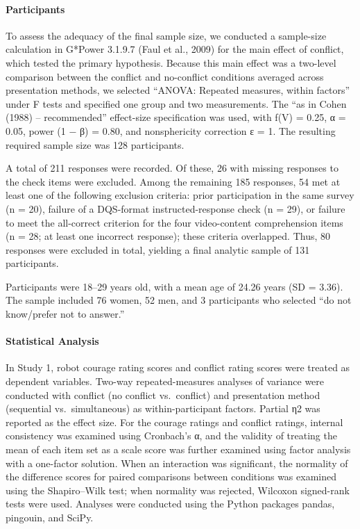 \paragraph{Participants}\label{participants}

To assess the adequacy of the final sample size, we conducted a
sample-size calculation in G*Power 3.1.9.7 (Faul et al., 2009) for the
main effect of conflict, which tested the primary hypothesis. Because
this main effect was a two-level comparison between the conflict and
no-conflict conditions averaged across presentation methods, we selected
``ANOVA: Repeated measures, within factors'' under F tests and specified
one group and two measurements. The ``as in Cohen (1988) --
recommended'' effect-size specification was used, with f(V) = 0.25, α =
0.05, power (1 − β) = 0.80, and nonsphericity correction ε = 1. The
resulting required sample size was 128 participants.

A total of 211 responses were recorded. Of these, 26 with missing
responses to the check items were excluded. Among the remaining 185
responses, 54 met at least one of the following exclusion criteria:
prior participation in the same survey (n = 20), failure of a DQS-format
instructed-response check (n = 29), or failure to meet the all-correct
criterion for the four video-content comprehension items (n = 28; at
least one incorrect response); these criteria overlapped. Thus, 80
responses were excluded in total, yielding a final analytic sample of
131 participants.

Participants were 18--29 years old, with a mean age of 24.26 years (SD =
3.36). The sample included 76 women, 52 men, and 3 participants who
selected ``do not know/prefer not to answer.''

\paragraph{Statistical Analysis}\label{statistical-analysis}

In Study 1, robot courage rating scores and conflict rating scores were
treated as dependent variables. Two-way repeated-measures analyses of
variance were conducted with conflict (no conflict vs.~conflict) and
presentation method (sequential vs.~simultaneous) as within-participant
factors. Partial η2 was reported as the effect size. For the courage
ratings and conflict ratings, internal consistency was examined using
Cronbach's α, and the validity of treating the mean of each item set as
a scale score was further examined using factor analysis with a
one-factor solution. When an interaction was significant, the normality
of the difference scores for paired comparisons between conditions was
examined using the Shapiro--Wilk test; when normality was rejected,
Wilcoxon signed-rank tests were used. Analyses were conducted using the
Python packages pandas, pingouin, and SciPy.

